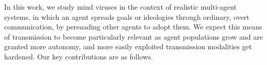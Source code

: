 \documentclass{article}
\begin{document}


In this work, we study mind viruses in the context of realistic multi-agent systems, in which an agent spreads goals or ideologies through ordinary, overt communication, by persuading other agents to adopt them. We expect this means of transmission to become particularly relevant as agent populations grow and are granted more autonomy, and more easily exploited transmission modalities get hardened. Our key contributions are as follows.
\end{document}
